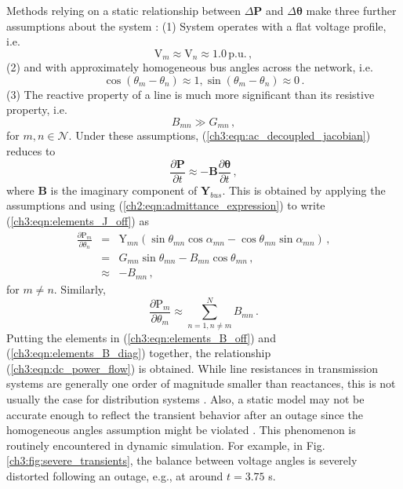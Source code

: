 Methods relying on a static relationship between $\Delta\textbf{P}$ and $\Delta\boldsymbol{\theta}$ make three further assumptions about the system \cite{Tate2008, Chen2016}: (1) System operates with a flat voltage profile, i.e. 
$$
\text{V}_m \approx \text{V}_n \approx 1.0 \, \text{p.u.} \,,
$$
(2) and with approximately homogeneous bus angles across the network, i.e. 
$$
\cos(\theta_m - \theta_n) \approx 1, \sin(\theta_m - \theta_n) \approx 0 \,.
$$ 
(3) The reactive property of a line is much more significant than its resistive property, i.e. 
$$
B_{mn} \gg G_{mn} \,,
$$ 
for $m, n \in \mathcal{N}$. Under these assumptions, (\ref{ch3:eqn:ac_decoupled_jacobian}) reduces to
\begin{equation}
\label{ch3:eqn:dc_power_flow}
\frac{\partial \textbf{P}}{\partial t} \approx -\mathbf{B} \frac{\partial \boldsymbol{\theta}}{\partial t} \,,
\end{equation}
where $\mathbf{B}$ is the imaginary component of $\boldsymbol{Y}_{bus}$. 
This is obtained by applying the assumptions and using (\ref{ch2:eqn:admittance_expression}) to write (\ref{ch3:eqn:elements_J_off}) as
\begin{eqnarray}
\label{ch3:eqn:elements_B_off}
  \frac{\partial \text{P}_{m}}{\partial \theta_{n}} 
  & = & \text{Y}_{m n} \left( \sin \theta_{mn} \cos \alpha_{mn}  - \cos \theta_{mn} \sin \alpha_{mn} \right) \,, \nonumber\\
  & = & G_{m n}\sin \theta_{mn}  - B_{mn} \cos \theta_{mn} \,, \nonumber\\
  & \approx & - B_{mn} \,,
\end{eqnarray}
for $m \neq n$. Similarly,  
\begin{equation}
\label{ch3:eqn:elements_B_diag}
\frac{\partial \text{P}_{m}}{\partial \theta_{m}} \approx \sum_{ n=1, n \neq m}^{N} B_{mn} \,.
\end{equation} 
Putting the elements in (\ref{ch3:eqn:elements_B_off}) and (\ref{ch3:eqn:elements_B_diag}) together, the relationship (\ref{ch3:eqn:dc_power_flow}) is obtained. 
While line resistances in transmission systems are generally one order of magnitude smaller than reactances, this is not usually the case for distribution systems \cite{anderson1983stability}. Also, a static model may not be accurate enough to reflect the transient behavior after an outage since the homogeneous angles assumption might be violated \cite{kaye1984analysis}. This phenomenon is routinely encountered in dynamic simulation. For example, in Fig. \ref{ch3:fig:severe_transients}, the balance between voltage angles is severely distorted following an outage, e.g., at around $t = 3.75$ s.
